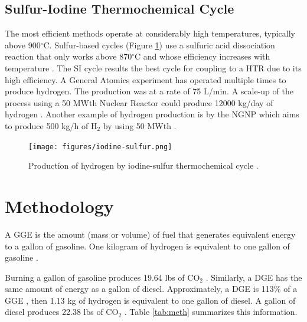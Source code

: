 \documentclass{anstrans}
\begin{document}
\subsection{Sulfur-Iodine Thermochemical Cycle}

The most efficient methods operate at considerably high temperatures, typically above 900$^{\circ}$C. Sulfur-based cycles (Figure \ref{fig:isulfur}) use a sulfuric acid dissociation reaction that only works above 870$^{\circ}$C and whose efficiency increases with temperature \cite{cea_gas-cooled_2006}.
The \gls{SI} cycle results the best cycle for coupling to a \gls{HTR} due to its high efficiency. A General Atomics experiment has operated multiple times to produce hydrogen.
The production was at a rate of 75 L/min. A scale-up of the process using a 50 MWth Nuclear Reactor could produce 12000 kg/day of hydrogen \cite{benjamin_russ_sulfur_2009}.
Another example of hydrogen production is by the \gls{NGNP} \cite{macdonald_ngnp_2003} which aims to produce 500 kg/h of H$_2$ by using 50 MWth \cite{cea_gas-cooled_2006}.

\begin{figure}[]
	\centering
	\texttt{[image: figures/iodine-sulfur.png]}
	\hfill
	\caption{Production of hydrogen by iodine-sulfur thermochemical cycle \cite{cea_gas-cooled_2006}.}
	\label{fig:isulfur}
\end{figure}

\section{Methodology}
\label{method}




A \gls{GGE} is the amount (mass or volume) of fuel that generates equivalent energy to a gallon of gasoline.
One kilogram of hydrogen is equivalent to one gallon of gasoline \cite{doe_office_of_energy_efficiency_and_renewable_energy_hydrogen_2020}.

Burning a gallon of gasoline produces 19.64 lbs of CO$_2$ \cite{us_energy_information_administration_how_2014}.
Similarly, a \gls{DGE} has the same amount of energy as a gallon of diesel. Approximately, a \gls{DGE} is 113\% of a \gls{GGE} \cite{alternative_fuels_data_center_fuel_2014}, then 1.13 kg of hydrogen is equivalent to one gallon of diesel.
A gallon of diesel produces 22.38 lbs of CO$_2$ \cite{us_energy_information_administration_how_2014}.
Table \ref{tab:meth} summarizes this information.
\end{document}
